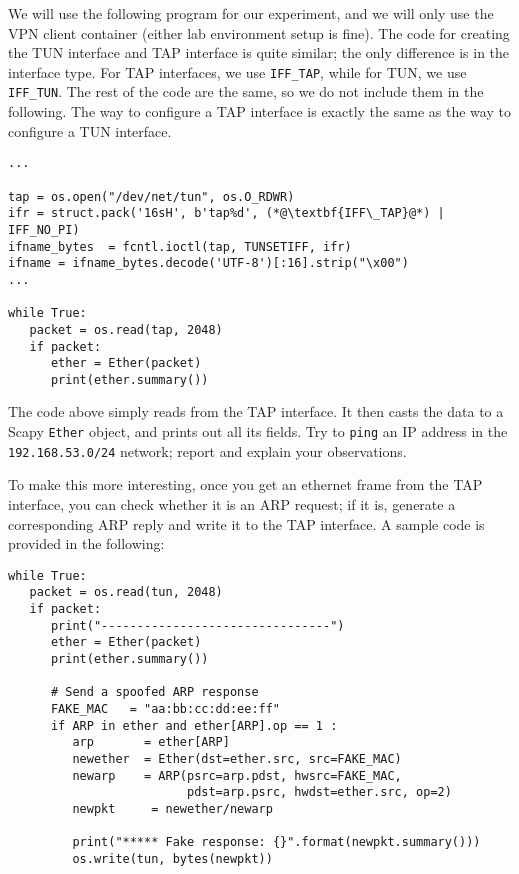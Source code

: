 We will use the following program for our experiment, and we will
only use the VPN client container (either lab environment setup is fine).
The code 
for creating the TUN interface and TAP interface is quite similar; the 
only difference is in the interface type. For TAP interfaces, we use
\texttt{IFF\_TAP}, while for TUN,  we use \texttt{IFF\_TUN}.
The rest of the code are the same, so we do not include them in the 
following. The way to configure a TAP interface is exactly the same 
as the way to configure a TUN interface. 


\begin{lstlisting}
...

tap = os.open("/dev/net/tun", os.O_RDWR)
ifr = struct.pack('16sH', b'tap%d', (*@\textbf{IFF\_TAP}@*) | IFF_NO_PI)
ifname_bytes  = fcntl.ioctl(tap, TUNSETIFF, ifr)
ifname = ifname_bytes.decode('UTF-8')[:16].strip("\x00")
... 

while True:
   packet = os.read(tap, 2048)
   if packet:
      ether = Ether(packet)
      print(ether.summary())
\end{lstlisting}
 
The code above simply reads from the TAP interface. It then casts 
the data to a Scapy \texttt{Ether} object, and prints out all 
its fields. Try to \texttt{ping} an IP address in
the \texttt{192.168.53.0/24} network; report and explain your observations.  

To make this more interesting, once you get an ethernet frame from the TAP interface,
you can check whether it is an ARP request; if it is, generate a corresponding
ARP reply and write it to the TAP interface. A sample code is provided in the
following:

\begin{lstlisting}
while True:
   packet = os.read(tun, 2048)
   if packet:
      print("--------------------------------")
      ether = Ether(packet)
      print(ether.summary())

      # Send a spoofed ARP response
      FAKE_MAC   = "aa:bb:cc:dd:ee:ff"
      if ARP in ether and ether[ARP].op == 1 :
         arp       = ether[ARP]
         newether  = Ether(dst=ether.src, src=FAKE_MAC)
         newarp    = ARP(psrc=arp.pdst, hwsrc=FAKE_MAC,
                         pdst=arp.psrc, hwdst=ether.src, op=2)
         newpkt     = newether/newarp

         print("***** Fake response: {}".format(newpkt.summary()))
         os.write(tun, bytes(newpkt))
\end{lstlisting}

